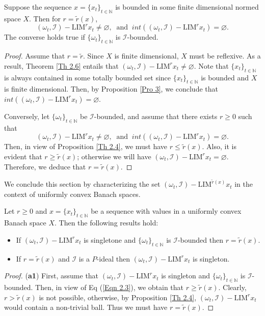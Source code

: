 \documentclass[reqno]{amsart}
\begin{document}
{\begin{corollary}
Suppose the sequence $x=\{x_t\}_{t\in\mathbb{N}}$ is bounded in some finite dimensional normed space $X$. Then for $r=\tilde{r}(x)$, 
	$$
(\omega_t,\mathcal{I})-\text{LIM}^{r} x_t\neq\varnothing,~\mbox{ and }~int((\omega_t,\mathcal{I})-\text{LIM}^{r} x_t)=\varnothing.
	$$ 
	The converse holds true if $\{\omega_t\}_{t\in\mathbb{N}}$ is $\mathcal{I}$-bounded.
\end{corollary}
\begin{proof}
Assume that $r=\tilde{r}$.
	Since $X$ is finite dimensional, $X$ must be reflexive.  As a result, Theorem \ref{Th 2.6} entails that $(\omega_t,\mathcal{I})-\text{LIM}^{r} x_t\neq\varnothing$. Note that $\{x_t\}_{t\in\mathbb{N}}$ is always contained in some totally bounded set since $\{x_t\}_{t\in\mathbb{N}}$ is bounded and $X$ is finite dimensional. Then, by Proposition \ref{Pro 3}, we conclude that
	$int((\omega_t,\mathcal{I})-\text{LIM}^{r} x_t)=\varnothing.$
	
	
	Conversely, let  $\{\omega_t\}_{t\in\mathbb{N}}$ be $\mathcal{I}$-bounded, and assume that there exists $r\geq 0$ such that  	
	$$
	(\omega_t,\mathcal{I})-\text{LIM}^{r} x_t\neq\varnothing,~\mbox{ and }~int((\omega_t,\mathcal{I})-\text{LIM}^{r} x_t)=\varnothing.
	$$ 
	Then, in view of Proposition \ref{Th 2.4}, we must have  $r\leq\tilde{r}(x).$ Also, it is evident that $r\geq \tilde{r}(x)$; otherwise we will have
	$(\omega_t,\mathcal{I})-\text{LIM}^{r} x_t=\varnothing$. Therefore, we deduce that $r=\tilde{r}(x)$.
\end{proof}

We conclude this section by characterizing the set $(\omega_t, \mathcal{I})-\text{LIM}^{\tilde r(x)} x_t$ in the context of uniformly convex Banach spaces.

\begin{theorem}\label{Th 2.14}
Let $r\geq0$ and $x=\{x_t\}_{t\in\mathbb{N}}$ be a sequence with values in a uniformly convex Banach space $X$.
Then the following results hold:
\begin{itemize}
\item[(\textbf{a1})] If $(\omega_t,\mathcal{I})-\text{LIM}^{r} x_t$ is singletone and $\{\omega_t\}_{t\in\mathbb{N}}$ is $\mathcal{I}$-bounded  then $r=\tilde{r}(x)$.
\item [(\textbf{a2})] If $r=\tilde{r}(x)$ and $\mathcal{I}$ is a $P$-ideal then $(\omega_t,\mathcal{I})-\text{LIM}^{r} x_t$ is singleton.
\end{itemize}
\end{theorem}
\begin{proof}
	(\textbf{a1}) First, assume that $(\omega_t,\mathcal{I})-\text{LIM}^{r} x_t$ is singleton and $\{\omega_t\}_{t\in\mathbb{N}}$ is $\mathcal{I}$-bounded. Then, in view of Eq (\ref{Eqn 2.3}), we obtain that $r\geq \tilde{r}(x)$. Clearly,
	$r>\tilde{r}(x)$ is not possible, otherwise, by Proposition \ref{Th 2.4}, $(\omega_t,\mathcal{I})-\text{LIM}^{r} x_t$ would contain a non-trivial ball. Thus we must have $r=\tilde{r}(x)$.
	

\end{proof}}
\end{document}
